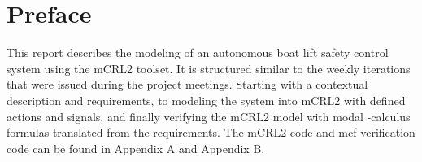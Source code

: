 \section{Preface}
This report describes the modeling of an autonomous boat lift safety control system using the mCRL2 toolset. It is structured similar to the weekly iterations that were issued during the project meetings. Starting with a contextual description and requirements, to modeling the system into mCRL2 with defined actions and signals, and finally verifying the mCRL2 model with modal {\textmu}-calculus formulas translated from the requirements. The mCRL2 code and mcf verification code can be found in Appendix A and Appendix B. 



